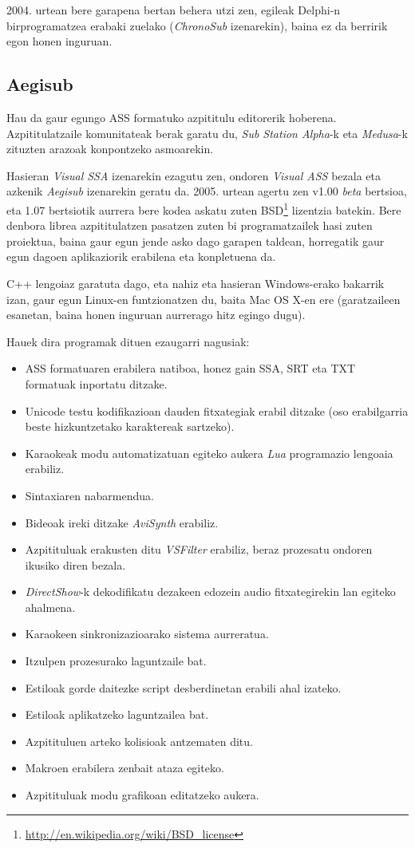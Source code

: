 2004. urtean bere garapena bertan behera utzi zen, egileak Delphi-n birprogramatzea erabaki zuelako (\textit{ChronoSub} izenarekin), baina ez da berririk egon honen inguruan.

\subsection{Aegisub}
Hau da gaur egungo ASS formatuko azpititulu editorerik hoberena. Azpititulatzaile komunitateak berak garatu du, \textit{Sub Station Alpha}-k eta \textit{Medusa}-k zituzten arazoak konpontzeko asmoarekin.

Hasieran \textit{Visual SSA} izenarekin ezagutu zen, ondoren \textit{Visual ASS} bezala eta azkenik \textit{Aegisub} izenarekin geratu da. 2005. urtean agertu zen v1.00 \textit{beta} bertsioa, eta 1.07 bertsiotik aurrera bere kodea askatu zuten BSD\footnote{\url{http://en.wikipedia.org/wiki/BSD_license}} lizentzia batekin. Bere denbora librea azpititulatzen pasatzen zuten bi programatzailek hasi zuten proiektua, baina gaur egun jende asko dago garapen taldean, horregatik gaur egun dagoen aplikaziorik erabilena eta konpletuena da.

C++ lengoiaz garatuta dago, eta nahiz eta hasieran Windows-erako bakarrik izan, gaur egun Linux-en funtzionatzen du, baita Mac OS X-en ere (garatzaileen esanetan, baina honen inguruan aurrerago hitz egingo dugu).

Hauek dira programak dituen ezaugarri nagusiak:
\begin{itemize}
\item ASS formatuaren erabilera natiboa, honez gain SSA, SRT eta TXT formatuak inportatu ditzake.
\item Unicode testu kodifikazioan dauden fitxategiak erabil ditzake (oso erabilgarria beste hizkuntzetako karaktereak sartzeko).
\item Karaokeak modu automatizatuan egiteko aukera \textit{Lua} programazio lengoaia erabiliz.
\item Sintaxiaren nabarmendua.
\item Bideoak ireki ditzake \textit{AviSynth} erabiliz.
\item Azpitituluak erakusten ditu \textit{VSFilter} erabiliz, beraz prozesatu ondoren ikusiko diren bezala.
\item \textit{DirectShow}-k dekodifikatu dezakeen edozein audio fitxategirekin lan egiteko ahalmena.
\item Karaokeen sinkronizazioarako sistema aurreratua.
\item Itzulpen prozesurako laguntzaile bat.
\item Estiloak gorde daitezke script desberdinetan erabili ahal izateko.
\item Estiloak aplikatzeko laguntzailea bat.
\item Azpitituluen arteko kolisioak antzematen ditu.
\item Makroen erabilera zenbait ataza egiteko.
\item Azpitituluak modu grafikoan editatzeko aukera.
\end{itemize}

